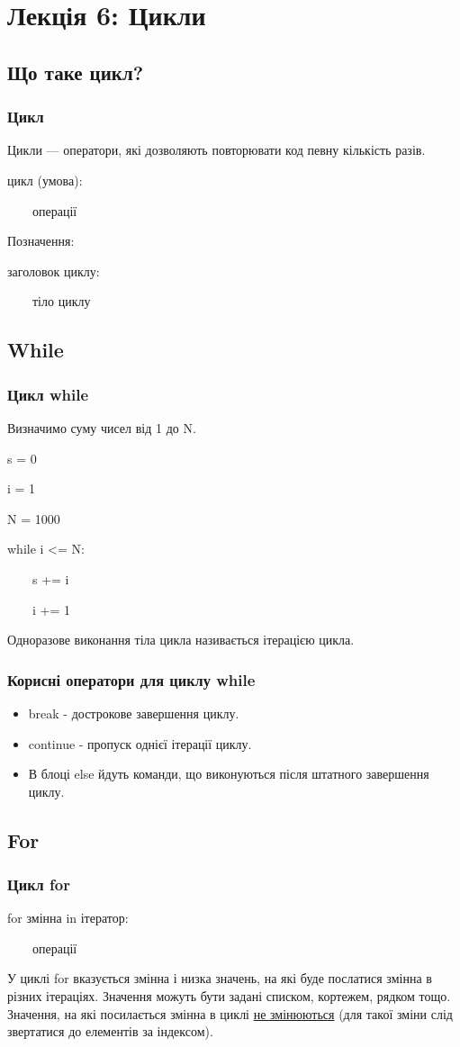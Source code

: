 \section*{Лекція 6: Цикли}
 
 \subsection{Що таке цикл?} 
\begin{frame}
\frametitle{Цикл}
Цикли — оператори, які дозволяють повторювати код певну кількість разів.

\huge{цикл (умова):

~~~~операції
}

\normalsize Позначення:

\large{заголовок циклу:

~~~~тіло циклу
}


\end{frame}

\subsection{While} 
\begin{frame}
\frametitle{Цикл while}
Визначимо суму чисел від 1 до N.

s = 0

i = 1 

N = 1000

while i <= N:

~~~~s += i

~~~~i += 1

Одноразове виконання тіла цикла називається ітерацією цикла.

\end{frame}

\begin{frame}
\frametitle{Корисні оператори для циклу while}
\begin{itemize}
  \item break - дострокове завершення циклу.
  \item continue - пропуск однієї ітерації циклу.
  \item В блоці else йдуть команди, що виконуються після штатного завершення циклу.
\end{itemize}
\end{frame}

 \subsection{For} 
\begin{frame}
\frametitle{Цикл for}
\huge{for змінна in ітератор:

~~~~операції
}

\normalsize 
У циклі for вказується змінна і низка значень, на які буде послатися змінна в різних ітераціях. Значення можуть бути задані списком, кортежем, рядком тощо. Значення, на які посилається змінна в циклі \underline{не змінюються} (для такої зміни слід звертатися до елементів за індексом).

\end{frame}

